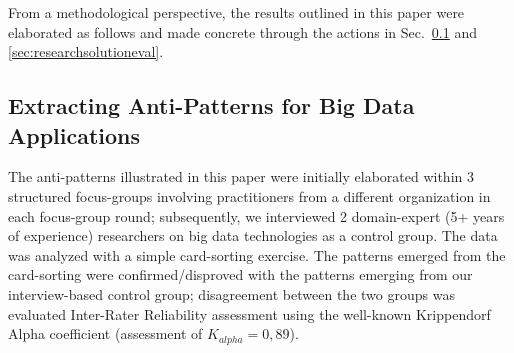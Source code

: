 \documentclass[smallextended]{svjour3}       %
\newcommand{\comment}[1]{{\textbf{\color{red}[#1]}}}
\newcommand{\todoMB}[2]{\linespread{0.7}\todo[color=yellow!50,#1]{\scriptsize\textbf{MB:}#2}}
\begin{document}
%
%
%

From a methodological perspective, the results outlined in this paper were elaborated as follows and made concrete through the actions in Sec.~\ref{sec:antipatternextraction} and \ref{sec:researchsolutioneval}.

\subsection{Extracting Anti-Patterns for Big Data Applications}\label{sec:antipatternextraction}

The anti-patterns illustrated in this paper were initially elaborated within 3 structured focus-groups \cite{focusgroup} involving practitioners from a different organization in each focus-group round; subsequently, we interviewed 2 domain-expert (5+ years of experience) researchers on big data technologies as a control group. The data was analyzed with a simple card-sorting exercise. The patterns emerged from the card-sorting were confirmed/disproved with the patterns emerging from our interview-based control group; disagreement between the two groups was evaluated Inter-Rater Reliability assessment using the well-known Krippendorf Alpha coefficient \cite{content} (assessment of $K_{alpha}=0,89$). 
\end{document}
